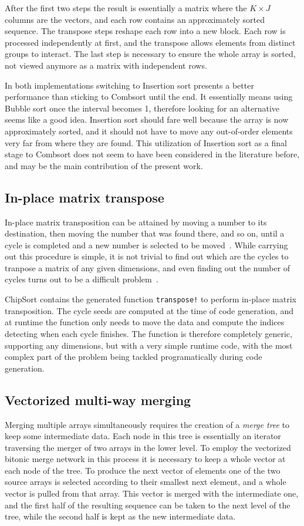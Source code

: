 \documentclass{juliacon}
\begin{document}
After the first two steps the result is essentially a matrix where the $K\times J$ columns are the vectors, and each row contains an approximately sorted sequence. The transpose steps reshape each row into a new block. Each row is processed independently at first, and the transpose allows elements from distinct groups to interact. The last step is necessary to ensure the whole array is sorted, not viewed anymore as a matrix with independent rows.

In both implementations switching to Insertion sort presents a better performance than sticking to Combsort until the end. It essentially means using Bubble sort once the interval becomes 1, therefore looking for an alternative seems like a good idea. Insertion sort should fare well because the array is now approximately sorted, and it should not have to move any out-of-order elements very far from where they are found. This utilization of Insertion sort as a final stage to Combsort does not seem to have been considered in the literature before, and may be the main contribution of the present work.

\subsection{In-place matrix transpose}
%
In-place matrix transposition can be attained by moving a number to its destination, then moving the number that was found there, and so on, until a cycle is completed and a new number is selected to be moved~\cite{10.1093/comjnl/2.1.47}. While carrying out this procedure is simple, it is not trivial to find out which are the cycles to tranpose a matrix of any given dimensions, and even finding out the number of cycles turns out to be a difficult problem~\cite[Sec. 1.3.3, Ex. 12]{DBLP:books/lib/Knuth97}.

ChipSort contains the generated function {\tt transpose!} to perform in-place matrix transposition. The cycle seeds are computed at the time of code generation, and at runtime the function only needs to move the data and compute the indices detecting when each cycle finishes. The function is therefore completely generic, supporting any dimensions, but with a very simple runtime code, with the most complex part of the problem being tackled programatically during code generation.

\subsection{Vectorized multi-way merging}
%
Merging multiple arrays simultaneously requires the creation of a {\em merge tree} to keep some intermediate data. Each node in this tree is essentially an iterator traversing the merger of two arrays in the lower level. To employ the vectorized bitonic merge network in this process it is necessary to keep a whole vector at each node of the tree. To produce the next vector of elements one of the two source arrays is selected according to their smallest next element, and a whole vector is pulled from that array. This vector is merged with the intermediate one, and the first half of the resulting sequence can be taken to the next level of the tree, while the second half is kept as the new intermediate data.
\end{document}
